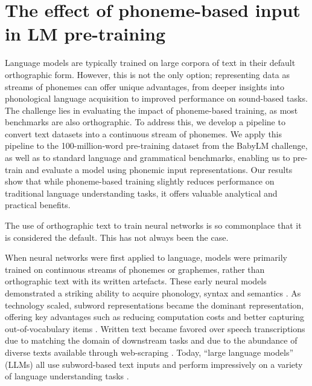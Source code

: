 \chapter{The effect of phoneme-based input in LM pre-training}\label{chapter:modelling}

Language models are typically trained on large corpora of text in their default orthographic form. However, this is not the only option; representing data as streams of phonemes can offer unique advantages, from deeper insights into phonological language acquisition to improved performance on sound-based tasks. The challenge lies in evaluating the impact of phoneme-based training, as most benchmarks are also orthographic. To address this, we develop a pipeline to convert text datasets into a continuous stream of phonemes. We apply this pipeline to the 100-million-word pre-training dataset from the BabyLM challenge, as well as to standard language and grammatical benchmarks, enabling us to pre-train and evaluate a model using phonemic input representations. Our results show that while phoneme-based training slightly reduces performance on traditional language understanding tasks, it offers valuable analytical and practical benefits. 

The use of orthographic text to train neural networks is so commonplace that it is considered the default. This has not always been the case.

When neural networks were first applied to language, models were primarily trained on continuous streams of phonemes or graphemes, rather than orthographic text with its written artefacts. These early neural models demonstrated a striking ability to acquire phonology, syntax and semantics \citep{elman-1990-finding, seidenberg1989distributed, prince-1997-optimality}. As technology scaled, subword representations became the dominant representation, offering key advantages such as reducing computation costs and better capturing out-of-vocabulary items \citep{sennrich-etal-2016-bpe}. Written text became favored over speech transcriptions due to matching the domain of downstream tasks and due to the abundance of diverse texts available through web-scraping \citep{bansal-2022-datascaling}. Today, ``large language models'' (LLMs) all use subword-based text inputs and perform impressively on a variety of language understanding tasks \citep{zellers-etal-2019-hellaswag, hendrycks-2020-mmlu, suzgun-2023-Big-Bench}.

